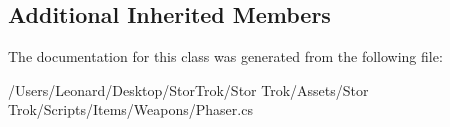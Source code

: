 \subsection*{Additional Inherited Members}


The documentation for this class was generated from the following file\+:\begin{DoxyCompactItemize}
\item 
/\+Users/\+Leonard/\+Desktop/\+Stor\+Trok/\+Stor Trok/\+Assets/\+Stor Trok/\+Scripts/\+Items/\+Weapons/Phaser.\+cs\end{DoxyCompactItemize}
